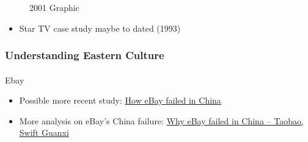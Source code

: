 \documentclass[
  11pt,
]{article}
\makeatletter
\let\oldparagraph\paragraph
\renewcommand{\paragraph}{
    \@ifstar
      \xxxParagraphStar
      \xxxParagraphNoStar
  }
\newcommand{\xxxParagraphStar}[1]{\oldparagraph*{#1}\mbox{}}
\newcommand{\xxxParagraphNoStar}[1]{\oldparagraph{#1}\mbox{}}
\providecommand{\tightlist}{%
  \setlength{\itemsep}{0pt}\setlength{\parskip}{0pt}}
\makeatother
\begin{document}
\begin{figure}[H]


\caption{\label{fig-1}2001 Graphic}

\end{figure}%

\begin{itemize}
\tightlist
\item
  Star TV case study maybe to dated (1993)
\end{itemize}

\subsubsection{Understanding Eastern
Culture}\label{understanding-eastern-culture}

\paragraph{Ebay}\label{ebay}

\begin{itemize}
\tightlist
\item
  Possible more recent study:
  \href{https://www.forbes.com/sites/helenwang/2010/09/12/how-ebay-failed-in-china/}{How
  eBay failed in China}
\item
  More analysis on eBay's China failure:
  \href{https://psmag.com/economics/why-ebay-failed-in-china-taobao-swift-guanxi-60072/}{Why
  eBay failed in China -- Taobao, Swift Guanxi}
\end{itemize}
\end{document}
